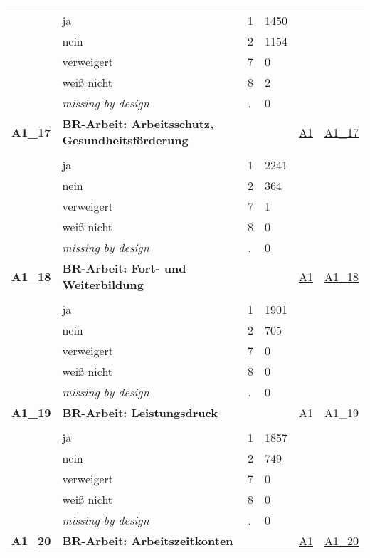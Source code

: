 \begin{longtable}{| L{2.45cm} | L{6cm} | C{1.5cm} | R{1cm} | C{2.25cm} | C{2.25cm} |}
   &  &  &  &  &  \\ 
   & ja & 1 & 1450 &  &  \\ 
   & nein & 2 & 1154 &  &  \\ 
   & verweigert & 7 & 0 &  &  \\ 
   & weiß nicht & 8 & 2 &  &  \\ 
   & \textit{missing by design} & \textit{.} & 0 &  &  \\ 
   \midrule
\textbf{A1\_17}\label{var:A1:17} & \textbf{BR-Arbeit: Arbeitsschutz, Gesundheitsförderung} &  &  & \hyperref[A1]{A1} & \hyperref[var:suf:A1:17]{A1\_17} \\ 
   &  &  &  &  &  \\ 
   & ja & 1 & 2241 &  &  \\ 
   & nein & 2 & 364 &  &  \\ 
   & verweigert & 7 & 1 &  &  \\ 
   & weiß nicht & 8 & 0 &  &  \\ 
   & \textit{missing by design} & \textit{.} & 0 &  &  \\ 
   \midrule
\textbf{A1\_18}\label{var:A1:18} & \textbf{BR-Arbeit: Fort- und Weiterbildung} &  &  & \hyperref[A1]{A1} & \hyperref[var:suf:A1:18]{A1\_18} \\ 
   &  &  &  &  &  \\ 
   & ja & 1 & 1901 &  &  \\ 
   & nein & 2 & 705 &  &  \\ 
   & verweigert & 7 & 0 &  &  \\ 
   & weiß nicht & 8 & 0 &  &  \\ 
   & \textit{missing by design} & \textit{.} & 0 &  &  \\ 
   \midrule
\textbf{A1\_19}\label{var:A1:19} & \textbf{BR-Arbeit: Leistungsdruck} &  &  & \hyperref[A1]{A1} & \hyperref[var:suf:A1:19]{A1\_19} \\ 
   &  &  &  &  &  \\ 
   & ja & 1 & 1857 &  &  \\ 
   & nein & 2 & 749 &  &  \\ 
   & verweigert & 7 & 0 &  &  \\ 
   & weiß nicht & 8 & 0 &  &  \\ 
   & \textit{missing by design} & \textit{.} & 0 &  &  \\ 
   \midrule
\textbf{A1\_20}\label{var:A1:20} & \textbf{BR-Arbeit: Arbeitszeitkonten} &  &  & \hyperref[A1]{A1} & \hyperref[var:suf:A1:20]{A1\_20} \\ 

\end{longtable}
